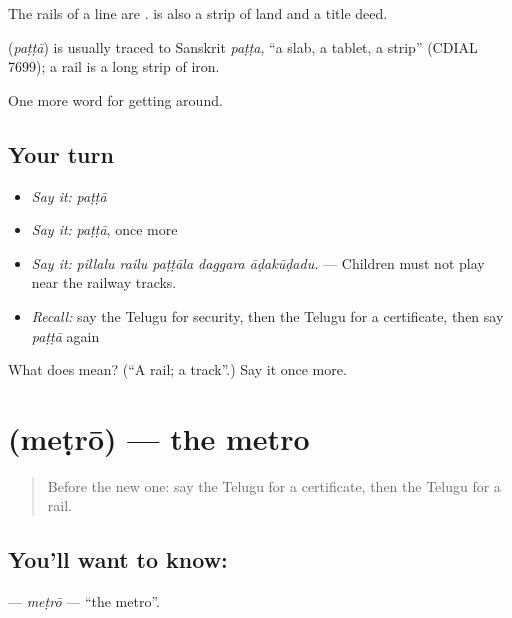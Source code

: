 The rails of a line are .  is also a strip of land and a title deed.

\begin{cousinweb}
\textbf{} (\emph{paṭṭā}) is usually traced to Sanskrit \emph{paṭṭa}, \textquotedblleft{}a slab, a tablet, a strip\textquotedblright{} (CDIAL 7699); a rail is a long strip of iron.
\end{cousinweb}

\begin{grammarlens}[title={What you've built}]
One more word for getting around.
\end{grammarlens}

\subsection*{Your turn}
\begin{itemize}
\raggedright
  \item \emph{Say it:} \emph{paṭṭā}
  \item \emph{Say it:} \emph{paṭṭā}, once more
  \item \emph{Say it:} \emph{pillalu railu paṭṭāla daggara āḍakūḍadu.} — Children must not play near the railway tracks.
  \item \emph{Recall:} say the Telugu for security, then the Telugu for a certificate, then say \emph{paṭṭā} again
\end{itemize}

\begin{tcolorbox}[breakable,colback=teal!4,colframe=teal!35!black,title={Before you move on}]
What does  mean? (\textquotedblleft{}A rail; a track\textquotedblright{}.) Say it once more.
\end{tcolorbox}
\section[\texorpdfstring{\te{మెట్రో} (meṭrō)}{మెట్రో (meṭrō)}]{ (meṭrō) — the metro}

\label{lesson:TE-C442-metro}



\begin{quote}
Before the new one: say the Telugu for a certificate, then the Telugu for a rail.
\end{quote}

\subsection*{You'll want to know: }
\textbf{} — \emph{meṭrō} — \textquotedblleft{}the metro\textquotedblright{}.

